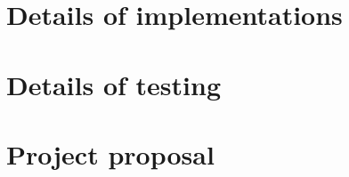\documentclass[12pt,a4paper,twoside,notitlepage]{report}
\theoremstyle{plain}
\theoremstyle{definition}
\theoremstyle{remark}
\begin{document}
\setcounter{page}{1}
\pagestyle{headings}



\cleardoublepage


\cleardoublepage


\cleardoublepage


\cleardoublepage


\cleardoublepage

\printbibliography[heading=bibintoc,category=cited]

\printbibliography[title={WARNING: Uncited},notcategory=cited]


\appendix
\chapter{Details of implementations} \label{appendix:implementation}


\chapter{Details of testing} \label{appendix:test}


\chapter{Project proposal} \label{appendix:proposal}

\end{document}
